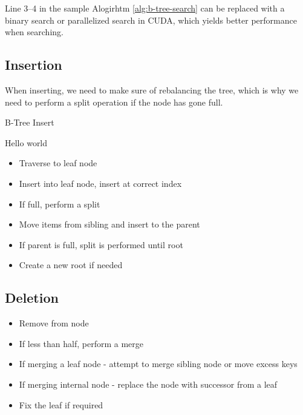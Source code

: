 Line 3--4 in the sample Alogirhtm \ref{alg:b-tree-search} can be replaced with a binary search or parallelized search in CUDA, which yields better performance when searching.

\subsection{Insertion}

When inserting, we need to make sure of rebalancing the tree, which is why we need to perform a split operation if the node has gone full.

\begin{algorithm}
  \caption{B-Tree Insert}\label{alg:b-tree-insert}
\end{algorithm}

Hello world

\begin{itemize}
  \item Traverse to leaf node
  \item Insert into leaf node, insert at correct index
  \item If full, perform a split
  \item Move items from sibling and insert to the parent
  \item If parent is full, split is performed until root
  \item Create a new root if needed
\end{itemize}


\subsection{Deletion}

\begin{itemize}
  \item Remove from node
  \item If less than half, perform a merge
  \item If merging a leaf node - attempt to merge sibling node or move excess keys
  \item If merging internal node - replace the node with successor from a leaf
  \item Fix the leaf if required
\end{itemize}



